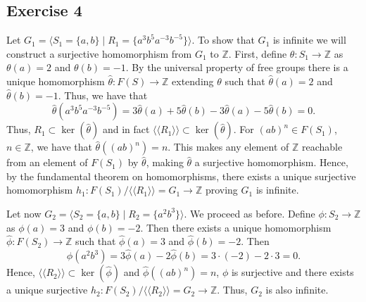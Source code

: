 \documentclass[11pt,a4paper]{article}
\newcommand{\Z}{\mathbb Z}
\begin{document}
\subsection*{Exercise 4}
Let $ G_1 = \langle S_1 = \{a, b\} \mid R_1 = \{a^3 b^5 a^{-3} b^{-5}\} \rangle $. To show that $ G_1 $ is infinite we will construct a surjective homomorphism from $ G_1 $ to $ \Z $. First, define $ \theta \colon S_1 \to \Z $ as $ \theta(a) = 2 $ and $ \theta(b) = -1 $. By the universal property of free groups there is a unique homomorphism $ \hat \theta \colon F(S) \to \Z $ extending $ \theta $ such that $ \hat \theta(a) = 2 $ and $ \hat \theta(b) = -1 $. Thus, we have that
$$
  \hat \theta (a^3 b^5 a^{-3} b^{-5}) = 3 \hat\theta(a) + 5 \hat\theta(b) - 3 \hat\theta(a) - 5 \hat\theta(b) = 0.
$$
Thus, $ R_1 \subset \ker (\hat \theta) $ and in fact $ \langle \langle R_1 \rangle \rangle \subset \ker (\hat \theta) $. For $ (ab)^n \in F(S_1)$, $ n \in \Z $, we have that $ \hat \theta((ab)^n) = n $. This makes any element of $\Z$ reachable from an element of $ F(S_1) $ by $ \hat \theta $, making $ \hat \theta $ a surjective homomorphism. Hence, by the fundamental theorem on homomorphisms, there exists a unique surjective homomorphism $ h_1: F(S_1)/\langle \langle R_1 \rangle \rangle = G_1 \to \Z $ proving $ G_1 $ is infinite.

Let now $ G_2 = \langle S_2 = \{a, b\} \mid R_2 = \{a^2 b^3\} \rangle $. We proceed as before. Define $ \phi \colon S_2 \to \Z $ as $ \phi(a) = 3 $ and $ \phi(b) = -2 $. Then there exists a unique homomorphism $ \hat \phi \colon F(S_2) \to \Z $ such that $ \hat \phi(a) = 3 $ and $ \hat \phi(b) = -2 $. Then
$$
  \hat \phi (a^2 b^3) = 3 \hat\phi(a) -2 \hat\phi(b) = 3 \cdot (-2) -2 \cdot 3 = 0.
$$
Hence, $ \langle \langle R_2 \rangle \rangle \subset \ker (\hat \phi) $ and $ \hat \phi((ab)^n) = n $,  $ \phi $ is surjective and there exists a unique surjective $ h_2: F(S_2)/\langle \langle R_2 \rangle \rangle = G_2 \to \Z $. Thus, $ G_2 $ is also infinite.
\end{document}
